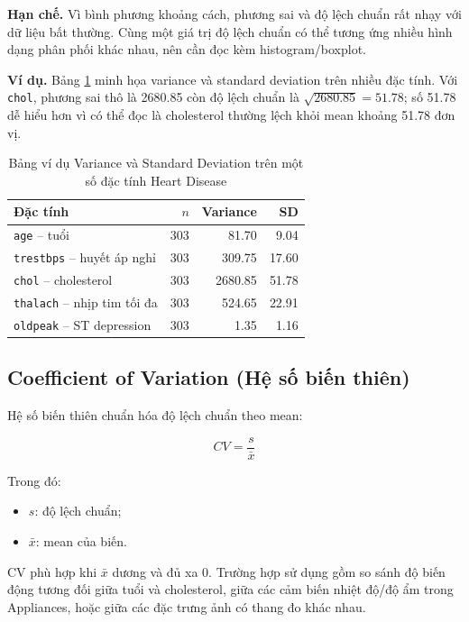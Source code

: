 \textbf{Hạn chế.} Vì bình phương khoảng cách, phương sai và độ lệch chuẩn rất nhạy với dữ liệu bất thường. Cùng một giá trị độ lệch chuẩn có thể tương ứng nhiều hình dạng phân phối khác nhau, nên cần đọc kèm histogram/boxplot.

\textbf{Ví dụ.} Bảng \ref{tab:chapter1_var_sd_example} minh họa variance và standard deviation trên nhiều đặc tính. Với \texttt{chol}, phương sai thô là 2680.85 còn độ lệch chuẩn là $\sqrt{2680.85}=51.78$; số 51.78 dễ hiểu hơn vì có thể đọc là cholesterol thường lệch khỏi mean khoảng 51.78 đơn vị.

\begin{table}[H]
\centering
\caption{Bảng ví dụ Variance và Standard Deviation trên một số đặc tính Heart Disease}
\label{tab:chapter1_var_sd_example}
\small
\begin{tabular}{lrrr}
\toprule
Đặc tính & $n$ & Variance & SD \\
\midrule
\texttt{age} -- tuổi & 303 & 81.70 & 9.04 \\
\texttt{trestbps} -- huyết áp nghỉ & 303 & 309.75 & 17.60 \\
\texttt{chol} -- cholesterol & 303 & 2680.85 & 51.78 \\
\texttt{thalach} -- nhịp tim tối đa & 303 & 524.65 & 22.91 \\
\texttt{oldpeak} -- ST depression & 303 & 1.35 & 1.16 \\
\bottomrule
\end{tabular}
\end{table}

\subsection{Coefficient of Variation (Hệ số biến thiên)}

Hệ số biến thiên chuẩn hóa độ lệch chuẩn theo mean:

\begin{equation}
CV = \frac{s}{\bar{x}}
\end{equation}

Trong đó:
\begin{itemize}[leftmargin=1.6em,label=\textbullet]
 \item $s$: độ lệch chuẩn;
 \item $\bar{x}$: mean của biến.
\end{itemize}

CV phù hợp khi $\bar{x}$ dương và đủ xa 0. Trường hợp sử dụng gồm so sánh độ biến động tương đối giữa tuổi và cholesterol, giữa các cảm biến nhiệt độ/độ ẩm trong Appliances, hoặc giữa các đặc trưng ảnh có thang đo khác nhau.

